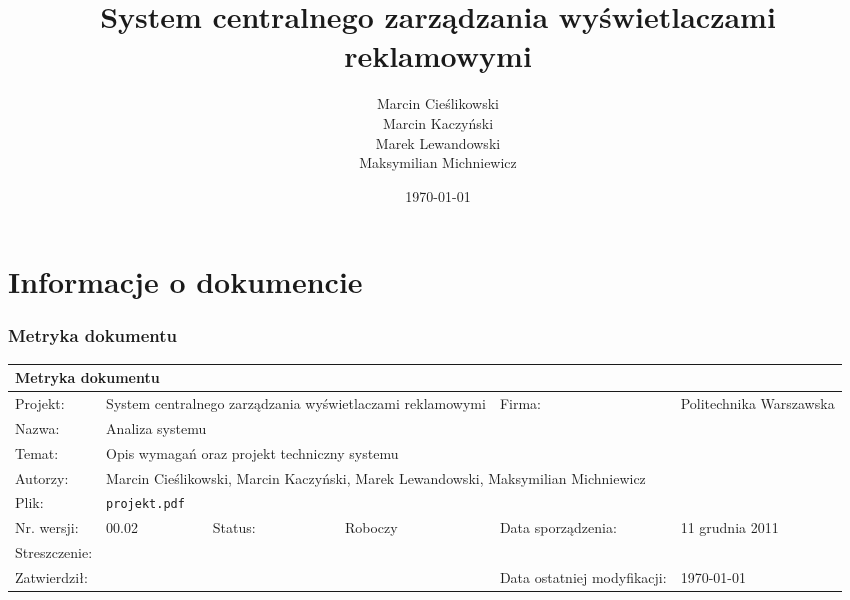 \documentclass[10pt,a4paper,titlepage]{article} %
\begin{document}
	

	\title{System centralnego zarządzania wyświetlaczami reklamowymi}
	\author{Marcin Cieślikowski\\
		Marcin Kaczyński\\
		Marek Lewandowski\\
		Maksymilian Michniewicz\\}
	\date{\today}
	\maketitle
	
	\section*{Informacje o dokumencie}
	
	\subsubsection*{Metryka dokumentu}
		\begin{table}[h]
		\begin{tabular}{|p{2cm}|p{2cm}|p{2cm}|p{2cm}|m{3cm}|m{2cm}|}
			\hline \multicolumn{6}{|l|}{Metryka dokumentu} \\ 
			\hline
			\hline Projekt: & \multicolumn{3}{|m{6cm}|}{System centralnego zarządzania wyświetlaczami reklamowymi}  & Firma: & Politechnika Warszawska \\ 
			\hline Nazwa: & \multicolumn{5}{|l|}{Analiza systemu}  \\ 
			\hline Temat: & \multicolumn{5}{|l|}{Opis wymagań oraz projekt techniczny systemu}  \\ 
			\hline Autorzy: & \multicolumn{5}{|l|}{Marcin Cieślikowski, Marcin Kaczyński, Marek Lewandowski, Maksymilian Michniewicz}  \\ 
			\hline Plik: &  \multicolumn{5}{|l|}{\texttt{projekt.pdf}} \\ 
			\hline Nr. wersji: & \multicolumn{1}{|l|}{00.02} & Status: & Roboczy  & Data sporządzenia: & 11 grudnia 2011 \\ 
			\hline Streszczenie:  & \multicolumn{5}{|l|}{}  \\ %
			\hline Zatwierdził: & \multicolumn{3}{|l|}{} & Data ostatniej modyfikacji: & \today \\ 
			\hline 
		\end{tabular} 
		\end{table}
\end{document}
